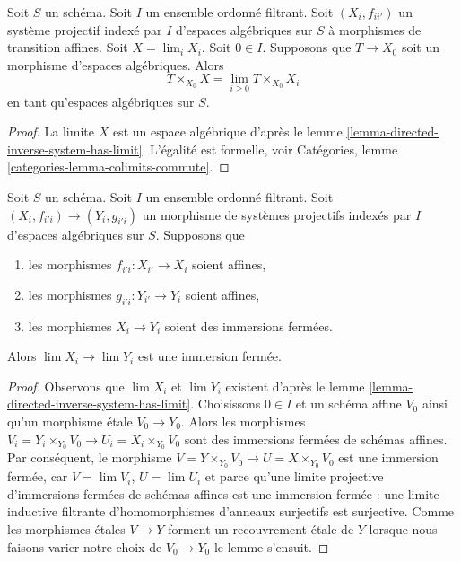 \begin{lemma}
\label{lemma-space-over-limit}
Soit $S$ un schéma. Soit $I$ un ensemble ordonné filtrant.
Soit $(X_i, f_{ii'})$ un système projectif indexé par $I$ d'espaces algébriques
sur $S$ à morphismes de transition affines.
Soit $X = \lim_i X_i$. Soit $0 \in I$. Supposons que $T \to X_0$ soit un
morphisme d'espaces algébriques. Alors
$$
T \times_{X_0} X = \lim_{i \geq 0} T \times_{X_0} X_i
$$
en tant qu'espaces algébriques sur $S$.
\end{lemma}

\begin{proof}
La limite $X$ est un espace algébrique d'après
le lemme \ref{lemma-directed-inverse-system-has-limit}.
L'égalité est formelle, voir
Catégories, lemme \ref{categories-lemma-colimits-commute}.
\end{proof}

\begin{lemma}
\label{lemma-directed-inverse-system-closed-immersions}
Soit $S$ un schéma. Soit $I$ un ensemble ordonné filtrant.
Soit $(X_i, f_{i'i}) \to (Y_i, g_{i'i})$ un morphisme
de systèmes projectifs indexés par $I$ d'espaces algébriques sur $S$.
Supposons que
\begin{enumerate}
\item les morphismes $f_{i'i} : X_{i'} \to X_i$ soient affines,
\item les morphismes $g_{i'i} : Y_{i'} \to Y_i$ soient affines,
\item les morphismes $X_i \to Y_i$ soient des immersions fermées.
\end{enumerate}
Alors $\lim X_i \to \lim Y_i$ est une immersion fermée.
\end{lemma}

\begin{proof}
Observons que $\lim X_i$ et $\lim Y_i$ existent d'après
le lemme \ref{lemma-directed-inverse-system-has-limit}.
Choisissons $0 \in I$ et un schéma affine $V_0$ ainsi qu'un morphisme \'etale
$V_0 \to Y_0$. Alors les morphismes
$V_i = Y_i \times_{Y_0} V_0 \to U_i = X_i \times_{Y_0} V_0$
sont des immersions fermées de schémas affines.
Par conséquent, le morphisme $V = Y \times_{Y_0} V_0 \to U = X \times_{Y_0} V_0$
est une immersion fermée, car $V = \lim V_i$, $U = \lim U_i$
et parce qu'une limite projective d'immersions fermées de schémas affines est une
immersion fermée : une limite inductive filtrante d'homomorphismes d'anneaux surjectifs
est surjective. Comme les morphismes \'etales $V \to Y$ forment un
recouvrement \'etale de $Y$ lorsque nous faisons varier notre choix de $V_0 \to Y_0$
le lemme s'ensuit.
\end{proof}


